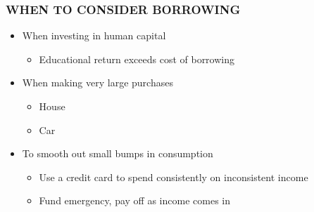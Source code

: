 \documentclass[12pt]{article}
\begin{document}
            \subsubsection{WHEN TO CONSIDER BORROWING}
                \begin{itemize}
                    \item When investing in human capital
                        \begin{itemize}
                            \item Educational return exceeds cost of borrowing
                        \end{itemize}
                    \item When making very large purchases
                        \begin{itemize}
                            \item House
                            \item Car
                        \end{itemize}
                    \item To smooth out small bumps in consumption
                        \begin{itemize}
                            \item Use a credit card to spend consistently on inconsistent income
                            \item Fund emergency, pay off as income comes in
                        \end{itemize}
                \end{itemize}
\end{document}
